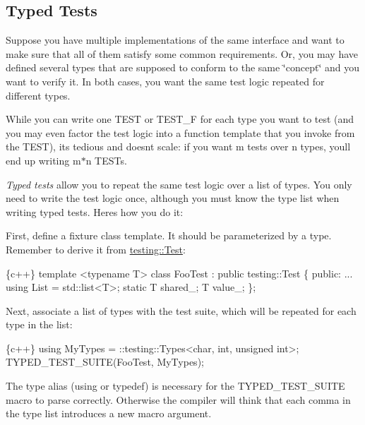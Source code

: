 \subsection*{Typed Tests}

Suppose you have multiple implementations of the same interface and want to make sure that all of them satisfy some common requirements. Or, you may have defined several types that are supposed to conform to the same \char`\"{}concept\char`\"{} and you want to verify it. In both cases, you want the same test logic repeated for different types.

While you can write one {\ttfamily T\+E\+ST} or {\ttfamily T\+E\+S\+T\+\_\+F} for each type you want to test (and you may even factor the test logic into a function template that you invoke from the {\ttfamily T\+E\+ST}), it\textquotesingle{}s tedious and doesn\textquotesingle{}t scale\+: if you want {\ttfamily m} tests over {\ttfamily n} types, you\textquotesingle{}ll end up writing {\ttfamily m$\ast$n} {\ttfamily T\+E\+ST}s.

{\itshape Typed tests} allow you to repeat the same test logic over a list of types. You only need to write the test logic once, although you must know the type list when writing typed tests. Here\textquotesingle{}s how you do it\+:

First, define a fixture class template. It should be parameterized by a type. Remember to derive it from {\ttfamily \mbox{\hyperlink{classtesting_1_1Test}{testing\+::\+Test}}}\+:


\begin{DoxyCode}
\{c++\}
template <typename T>
class FooTest : public testing::Test \{
 public:
  ...
  using List = std::list<T>;
  static T shared\_;
  T value\_;
\};
\end{DoxyCode}


Next, associate a list of types with the test suite, which will be repeated for each type in the list\+:


\begin{DoxyCode}
\{c++\}
using MyTypes = ::testing::Types<char, int, unsigned int>;
TYPED\_TEST\_SUITE(FooTest, MyTypes);
\end{DoxyCode}


The type alias ({\ttfamily using} or {\ttfamily typedef}) is necessary for the {\ttfamily T\+Y\+P\+E\+D\+\_\+\+T\+E\+S\+T\+\_\+\+S\+U\+I\+TE} macro to parse correctly. Otherwise the compiler will think that each comma in the type list introduces a new macro argument.

